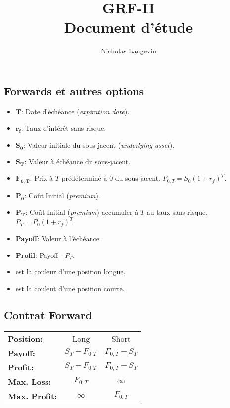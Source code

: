 \documentclass[10pt, french]{article}
\title{GRF-II \\ Document d'étude}
\author{Nicholas Langevin}
\begin{document}

\newpage

\small
\begin{multicols*}{3} %


\section*{Forwards et autres options}
\begin{itemize}[align=left,leftmargin=*]
    \item $\mathbf{T}$: Date d'échéance (\emph{expiration date}).
    \item $\mathbf{r_f}$: Taux d'intérêt sans risque.
    \item $\mathbf{S_0}$: Valeur initiale du sous-jacent (\emph{underlying asset}).
    \item $\mathbf{S_T}$: Valeur à échéance du sous-jacent.
    \item $\mathbf{F_{0,T}}$: Prix à $T$ prédéterminé à $0$ du sous-jacent. $F_{0,T}=S_0(1+r_f)^T$.
    \item $\mathbf{P_0}$: Coût Initial (\emph{premium}). %
    \item $\mathbf{P_T}$: Coût Initial (\emph{premium}) accumuler à $T$ au taux sans risque. $P_T = P_0(1+r_f)^T$.
    \item \textbf{Payoff}: Valeur à l'échéance.
    \item \textbf{Profil}: Payoff - $P_T$.
    \item {\color{LongColor} } est la couleur d'une position longue.
    \item {\color{ShortColor} } est la couleut d'une position courte.
\end{itemize}
\subsection*{Contrat Forward}
\begin{tabular}{>{\faAngleRight\hspace*{2mm}}lcc}
    \textbf{Position:}& Long & Short \\
    \textbf{Payoff:}& $S_T - F_{0,T}$ & $F_{0,T} - S_T$ \\
    \textbf{Profit:}& $S_T - F_{0,T}$ & $F_{0,T} - S_T$ \\
    \textbf{Max. Loss:}& $F_{0,T}$ & $\infty$ \\
    \textbf{Max. Profit:}& $\infty$ & $F_{0,T}$ \\
\end{tabular}  


\end{multicols*}
\end{document}

